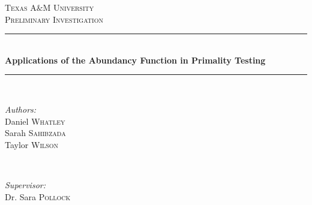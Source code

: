 \documentclass[11pt]{article}
\begin{document}



\begin{titlepage}

\newcommand{\HRule}{\rule{\linewidth}{0.5mm}} 

\center %
 

\textsc{\LARGE Texas A$\&$M University}\\[1.5cm] 
\textsc{\Large Preliminary Investigation}\\[0.5cm] %


\HRule \\[0.4cm]
{ \huge \bfseries Applications of the Abundancy Function in Primality Testing }\\[0.4cm]  %
\HRule \\[1.5cm]
 

\begin{minipage}{0.4\textwidth}
\begin{flushleft} \large
\emph{Authors:}\\
Daniel \textsc{Whatley}\\
Sarah \textsc{Sahibzada}\\
Taylor \textsc{Wilson}
\end{flushleft}
\end{minipage}
~
\begin{minipage}{0.4\textwidth}
\begin{flushright} \large
\emph{Supervisor:} \\
Dr. Sara \textsc{Pollock} 
\end{flushright}
\end{minipage}\\[4cm]



\end{titlepage}
\end{document}
